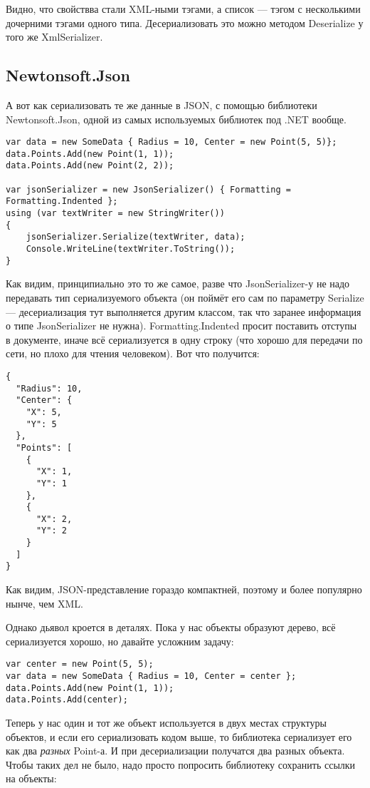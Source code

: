\documentclass{../../text-style}
\begin{document}
Видно, что свойствва стали XML-ными тэгами, а список --- тэгом с несколькими дочерними тэгами одного типа. Десериализовать это можно методом Deserialize у того же XmlSerializer.

\subsection{Newtonsoft.Json}

А вот как сериализовать те же данные в JSON, с помощью библиотеки Newtonsoft.Json, одной из самых используемых библиотек под .NET вообще.

\begin{verbatim}
var data = new SomeData { Radius = 10, Center = new Point(5, 5)};
data.Points.Add(new Point(1, 1));
data.Points.Add(new Point(2, 2));

var jsonSerializer = new JsonSerializer() { Formatting = Formatting.Indented };
using (var textWriter = new StringWriter())
{
    jsonSerializer.Serialize(textWriter, data);
    Console.WriteLine(textWriter.ToString());
}
\end{verbatim}

Как видим, принципиально это то же самое, разве что JsonSerializer-у не надо передавать тип сериализуемого объекта (он поймёт его сам по параметру Serialize --- десериализация тут выполняется другим классом, так что заранее информация о типе JsonSerializer не нужна). Formatting.Indented просит поставить отступы в документе, иначе всё сериализуется в одну строку (что хорошо для передачи по сети, но плохо для чтения человеком). Вот что получится:

\begin{verbatim}
{
  "Radius": 10,
  "Center": {
    "X": 5,
    "Y": 5
  },
  "Points": [
    {
      "X": 1,
      "Y": 1
    },
    {
      "X": 2,
      "Y": 2
    }
  ]
}
\end{verbatim}

Как видим, JSON-представление гораздо компактней, поэтому и более популярно нынче, чем XML.

Однако дьявол кроется в деталях. Пока у нас объекты образуют дерево, всё сериализуется хорошо, но давайте усложним задачу:

\begin{verbatim}
var center = new Point(5, 5);
var data = new SomeData { Radius = 10, Center = center };
data.Points.Add(new Point(1, 1));
data.Points.Add(center);
\end{verbatim}

Теперь у нас один и тот же объект используется в двух местах структуры объектов, и если его сериализовать кодом выше, то библиотека сериализует его как два \textit{разных} Point-а. И при десериализации получатся два разных объекта. Чтобы таких дел не было, надо просто попросить библиотеку сохранить ссылки на объекты:
\end{document}
